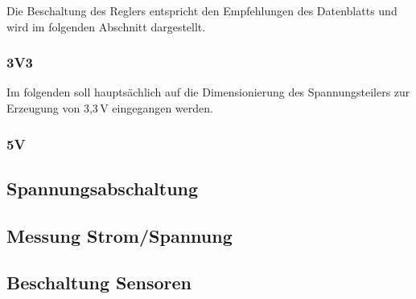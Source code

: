 Die Beschaltung des Reglers entspricht den Empfehlungen des Datenblatts und wird im folgenden Abschnitt dargestellt.


\subsubsection{3V3}\label{subsubsec.3v3}
Im folgenden soll hauptsächlich auf die Dimensionierung des Spannungsteilers zur Erzeugung von 3,3\,V eingegangen werden.

\subsubsection{5V}\label{subsubsec.5v}

\subsection{Spannungsabschaltung}\label{subsec.Spannungsabschaltung}

\subsection{Messung Strom/Spannung}\label{subsec.MessungStromSpannung}

\subsection{Beschaltung Sensoren}\label{subsec.BeschaltungSensoren}



